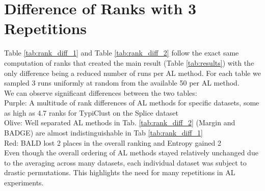 \documentclass[]{article}
\begin{document}
\section{Difference of Ranks with 3 Repetitions}\label{app:rank_difference}
Table \ref{tab:rank_diff_1} and Table \ref{tab:rank_diff_2} follow the exact same computation of ranks that created the main result (Table \ref{tab:results}) with the only difference being a reduced number of runs per AL method.
For each table we sampled 3 runs uniformly at random from the available 50 per AL method. \\
We can observe significant differences between the two tables: \\
{\color{purple}Purple}: A multitude of rank differences of AL methods for specific datasets, some as high as 4.7 ranks for TypiClust on the Splice dataset \\
{\color{olive}Olive}: Well separated AL methods in Tab. \ref{tab:rank_diff_2} (Margin and BADGE) are almost indistinguishable in Tab \ref{tab:rank_diff_1} \\
{\color{red}Red}: BALD lost 2 places in the overall ranking and Entropy gained 2 \\ [1mm]
Even though the overall ordering of AL methods stayed relatively unchanged due to the averaging across many datasets, each individual dataset was subject to drastic permutations.
This highlights the need for many repetitions in AL experiments.
\end{document}
